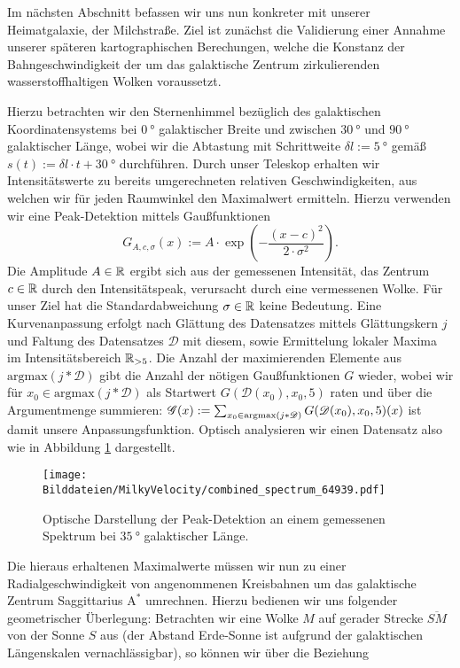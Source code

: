 \documentclass[../../main.tex]{subfiles}
\begin{document}
    Im nächsten Abschnitt befassen wir uns nun konkreter mit unserer Heimatgalaxie, der Milchstraße. Ziel ist zunächst die Validierung einer Annahme unserer späteren kartographischen Berechungen, welche die Konstanz der Bahngeschwindigkeit der um das galaktische Zentrum zirkulierenden wasserstoffhaltigen Wolken voraussetzt. 
    
    Hierzu betrachten wir den Sternenhimmel bezüglich des galaktischen Koordinatensystems bei $\SI{0}{\degree}$ galaktischer Breite und zwischen $\SI{30}{\degree}$ und $\SI{90}{\degree}$ galaktischer Länge, wobei wir die Abtastung mit Schrittweite $\delta l := \SI{5}{\degree}$ gemäß $s(t) := \delta l\cdot t + \SI{30}{\degree}$ durchführen. Durch unser Teleskop erhalten wir Intensitätswerte zu bereits umgerechneten relativen Geschwindigkeiten, aus welchen wir für jeden Raumwinkel den Maximalwert ermitteln. Hierzu verwenden wir eine Peak-Detektion mittels Gaußfunktionen
    \[
        G_{A,c,\sigma}(x) := A\cdot\exp(-\frac{(x-c)^2}{2\cdot\sigma^2}).
    \] 
    Die Amplitude $A\in\mathbb{R}$ ergibt sich aus der gemessenen Intensität, das Zentrum $c\in\mathbb{R}$ durch den Intensitätspeak, verursacht durch eine vermessenen Wolke. Für unser Ziel hat die Standardabweichung $\sigma\in\mathbb{R}$ keine Bedeutung. Eine Kurvenanpassung erfolgt nach Glättung des Datensatzes mittels Glättungskern $j$ und Faltung des Datensatzes $\mathcal{D}$ mit diesem, sowie Ermittelung lokaler Maxima im Intensitätsbereich $\mathbb{R}_{>5}$. Die Anzahl der maximierenden Elemente aus $\text{argmax}(j\ast\mathcal{D})$ gibt die Anzahl der nötigen Gaußfunktionen $G$ wieder, wobei wir für $x_0\in\text{argmax}(j\ast\mathcal{D})$ als Startwert $G(\mathcal{D}(x_0),x_0,5)$ raten und über die Argumentmenge summieren: $\mathcal G(x) := \sum_{x_0\in\text{argmax}(j\ast\mathcal{D})}G(\mathcal{D}(x_0),x_0,5)(x)$ ist damit unsere Anpassungsfunktion. Optisch analysieren wir einen Datensatz also wie in Abbildung \ref{fig:combined_spectrum_64939} dargestellt. 
    \begin{figure}[H]
        \centering
        \texttt{[image: Bilddateien/MilkyVelocity/combined\_spectrum\_64939.pdf]}
        \caption{Optische Darstellung der Peak-Detektion an einem gemessenen Spektrum bei $\SI{35}{\degree}$ galaktischer Länge.}
        \label{fig:combined_spectrum_64939}
    \end{figure} 
    Die hieraus erhaltenen Maximalwerte müssen wir nun zu einer Radialgeschwindigkeit von angenommenen Kreisbahnen um das galaktische Zentrum Saggittarius $\text{A}^*$ umrechnen. Hierzu bedienen wir uns folgender geometrischer Überlegung: Betrachten wir eine Wolke $M$ auf gerader Strecke $\overline{SM}$ von der Sonne $S$ aus (der Abstand Erde-Sonne ist aufgrund der galaktischen Längenskalen vernachlässigbar), so können wir über die Beziehung 
\end{document}

